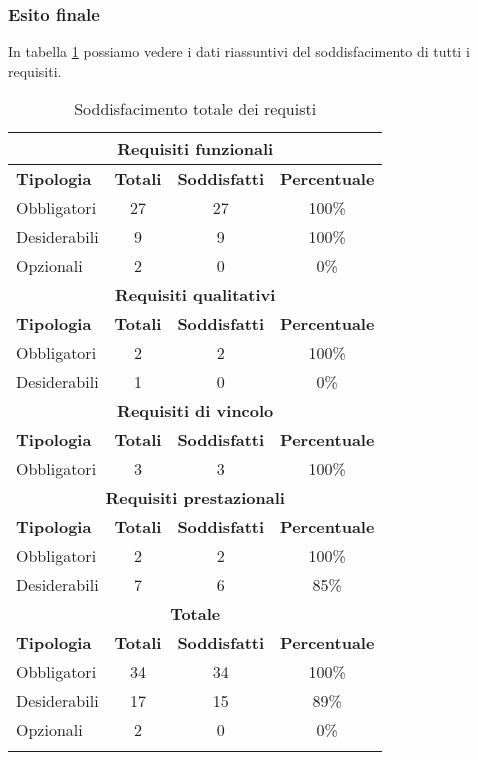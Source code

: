 \subsubsection{Esito finale}
In tabella \ref{tab:esito-requisiti-finale} possiamo vedere i dati riassuntivi del soddisfacimento di tutti i requisiti.
\begin{longtable}{l c c c}  
\endhead
\hline\hline
\multicolumn{4}{c}{\textbf{Requisiti funzionali}}\\
\hline
\textbf{Tipologia} & \textbf{Totali} & \textbf{Soddisfatti} & \textbf{Percentuale}\\
Obbligatori 		&		27		&			27			&		100\%			\\
Desiderabili 		&		9		&			9			&		100\%			\\
Opzionali			&		2		&			0			&		0\%			\\
\hline\hline
\multicolumn{4}{c}{\textbf{Requisiti qualitativi}}\\
\hline
\textbf{Tipologia} & \textbf{Totali} & \textbf{Soddisfatti} & \textbf{Percentuale}\\
Obbligatori 		&		2		&			2			&		100\%			\\
Desiderabili 		&		1		&			0			&		0\%				\\
\hline\hline
\multicolumn{4}{c}{\textbf{Requisiti di vincolo}}\\
\hline
\textbf{Tipologia} & \textbf{Totali} & \textbf{Soddisfatti} & \textbf{Percentuale}\\
Obbligatori 		&		3		&			3			&			100\%		\\
\hline\hline
\multicolumn{4}{c}{\textbf{Requisiti prestazionali}}\\
\hline
\textbf{Tipologia} & \textbf{Totali} & \textbf{Soddisfatti} & \textbf{Percentuale}\\
Obbligatori 		&		2		&			2			&			100\%		\\
Desiderabili 		&		7		&			6			&			85\%		\\
\hline\hline
\multicolumn{4}{c}{\textbf{Totale}}\\
\hline
\textbf{Tipologia} & \textbf{Totali} & \textbf{Soddisfatti} & \textbf{Percentuale}\\
Obbligatori 		&		34		&			34			&		100\%			\\
Desiderabili 		&		17		&			15			&		89\%			\\
Opzionali			&		2		&			0			&		0\%			\\


\hline
\caption{Soddisfacimento totale dei requisti}
\label{tab:esito-requisiti-finale}
\end{longtable}

